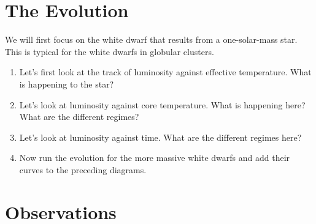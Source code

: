 \documentclass{article}
\begin{document}
\section{The Evolution}

We will first focus on the white dwarf that results from a one-solar-mass star.  This is typical for the white dwarfs in globular clusters.

\begin{enumerate}
\item Let's first look at the track of luminosity against effective temperature.  What is happening to the star?
\item Let's look at luminosity against core temperature.  What is happening here?  What are the different regimes?
\item Let's look at luminosity against time.  What are the different regimes here?
\item 
Now run the evolution for the more massive white dwarfs and add their curves to the preceding diagrams.
\end{enumerate}

\section{Observations}

 
\end{document}
